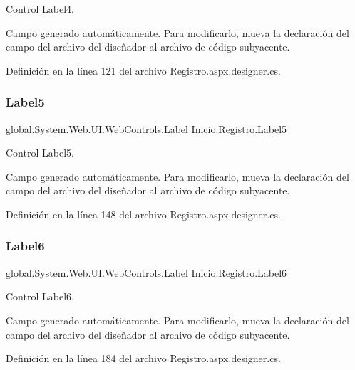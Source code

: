 Control Label4. 

Campo generado automáticamente. Para modificarlo, mueva la declaración del campo del archivo del diseñador al archivo de código subyacente. 

Definición en la línea 121 del archivo Registro.\+aspx.\+designer.\+cs.

\mbox{\label{classInicio_1_1Registro_abe5ff1ad9dfeb25a9e673175b1aa828f}} 
\subsubsection{\texorpdfstring{Label5}{Label5}}
{\footnotesize\ttfamily global.\+System.\+Web.\+U\+I.\+Web\+Controls.\+Label Inicio.\+Registro.\+Label5\hspace{0.3cm}{\ttfamily [protected]}}



Control Label5. 

Campo generado automáticamente. Para modificarlo, mueva la declaración del campo del archivo del diseñador al archivo de código subyacente. 

Definición en la línea 148 del archivo Registro.\+aspx.\+designer.\+cs.

\mbox{\label{classInicio_1_1Registro_a1f4d81dd35af2a53cf1df120b4f9b383}} 
\subsubsection{\texorpdfstring{Label6}{Label6}}
{\footnotesize\ttfamily global.\+System.\+Web.\+U\+I.\+Web\+Controls.\+Label Inicio.\+Registro.\+Label6\hspace{0.3cm}{\ttfamily [protected]}}



Control Label6. 

Campo generado automáticamente. Para modificarlo, mueva la declaración del campo del archivo del diseñador al archivo de código subyacente. 

Definición en la línea 184 del archivo Registro.\+aspx.\+designer.\+cs.

\mbox{\label{classInicio_1_1Registro_a1f3fd3c1774cb311690a4246ba5aca66}} 
